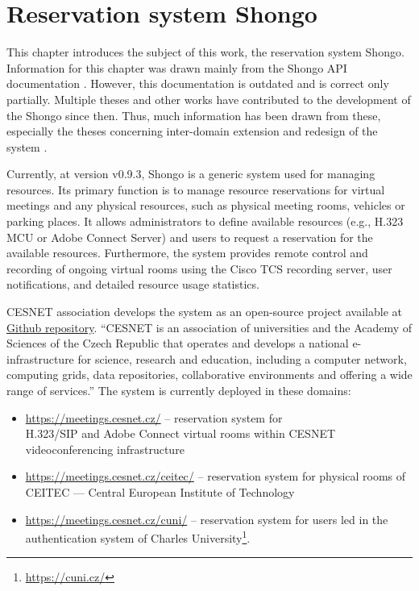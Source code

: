 \chapter{Reservation system Shongo}
This chapter introduces the subject of this work, the reservation system Shongo.
Information for this chapter was drawn mainly from the Shongo API documentation . However, this documentation is outdated and is correct only partially. Multiple theses and other works have contributed to the development of the Shongo since then. Thus, much information has been drawn from these, especially the theses concerning inter-domain extension  and redesign of the system .

Currently, at version v0.9.3, Shongo is a generic system used for managing resources.
Its primary function is to manage resource reservations for virtual meetings and any physical resources, such as physical meeting rooms, vehicles or parking places.
It allows administrators to define available resources (e.g., H.323 MCU or Adobe Connect Server) and users to request a reservation for the available resources.
Furthermore, the system provides remote control and recording of ongoing virtual rooms using the Cisco TCS recording server, user notifications, and detailed resource usage statistics.
\cite{shongo}

CESNET association develops the system as an open-source project available at \href{https://github.com/shongo/shongo}{Github repository}.
\enquote{CESNET is an association of universities and the Academy of Sciences of the Czech Republic that operates and develops a national e-infrastructure for science, research and education, including a computer network, computing grids, data repositories, collaborative environments and offering a wide range of services.} \cite{cesnet}
The system is currently deployed in these domains:
\begin{itemize}
    \item \url{https://meetings.cesnet.cz/} -- reservation system for \\
    H.323/SIP and Adobe Connect virtual rooms within CESNET videoconferencing infrastructure
    \item \url{https://meetings.cesnet.cz/ceitec/} -- reservation system for physical rooms of CEITEC --- Central European Institute of Technology
    \item \url{https://meetings.cesnet.cz/cuni/} -- reservation system for users led in the authentication system of Charles University\footnote{\url{https://cuni.cz/}}.
\end{itemize}

